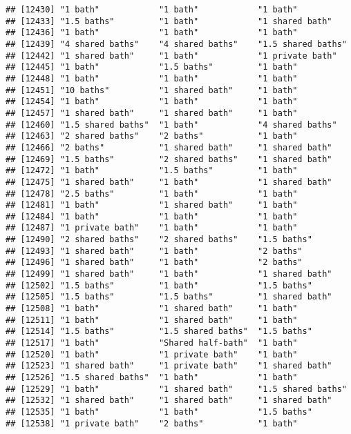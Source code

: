 \documentclass[
]{article}
\begin{document}
\begin{verbatim}
## [12430] "1 bath"            "1 bath"            "1 bath"           
## [12433] "1.5 baths"         "1 bath"            "1 shared bath"    
## [12436] "1 bath"            "1 bath"            "1 bath"           
## [12439] "4 shared baths"    "4 shared baths"    "1.5 shared baths" 
## [12442] "1 shared bath"     "1 bath"            "1 private bath"   
## [12445] "1 bath"            "1.5 baths"         "1 bath"           
## [12448] "1 bath"            "1 bath"            "1 bath"           
## [12451] "10 baths"          "1 shared bath"     "1 bath"           
## [12454] "1 bath"            "1 bath"            "1 bath"           
## [12457] "1 shared bath"     "1 shared bath"     "1 bath"           
## [12460] "1.5 shared baths"  "1 bath"            "4 shared baths"   
## [12463] "2 shared baths"    "2 baths"           "1 bath"           
## [12466] "2 baths"           "1 shared bath"     "1 shared bath"    
## [12469] "1.5 baths"         "2 shared baths"    "1 shared bath"    
## [12472] "1 bath"            "1.5 baths"         "1 bath"           
## [12475] "1 shared bath"     "1 bath"            "1 shared bath"    
## [12478] "2.5 baths"         "1 bath"            "1 bath"           
## [12481] "1 bath"            "1 shared bath"     "1 bath"           
## [12484] "1 bath"            "1 bath"            "1 bath"           
## [12487] "1 private bath"    "1 bath"            "1 bath"           
## [12490] "2 shared baths"    "2 shared baths"    "1.5 baths"        
## [12493] "1 shared bath"     "1 bath"            "2 baths"          
## [12496] "1 shared bath"     "1 bath"            "2 baths"          
## [12499] "1 shared bath"     "1 bath"            "1 shared bath"    
## [12502] "1.5 baths"         "1 bath"            "1.5 baths"        
## [12505] "1.5 baths"         "1.5 baths"         "1 shared bath"    
## [12508] "1 bath"            "1 shared bath"     "1 bath"           
## [12511] "1 bath"            "1 shared bath"     "1 bath"           
## [12514] "1.5 baths"         "1.5 shared baths"  "1.5 baths"        
## [12517] "1 bath"            "Shared half-bath"  "1 bath"           
## [12520] "1 bath"            "1 private bath"    "1 bath"           
## [12523] "1 shared bath"     "1 private bath"    "1 shared bath"    
## [12526] "1.5 shared baths"  "1 bath"            "1 bath"           
## [12529] "1 bath"            "1 shared bath"     "1.5 shared baths" 
## [12532] "1 shared bath"     "1 shared bath"     "1 shared bath"    
## [12535] "1 bath"            "1 bath"            "1.5 baths"        
## [12538] "1 private bath"    "2 baths"           "1 bath"           

\end{verbatim}
\end{document}
